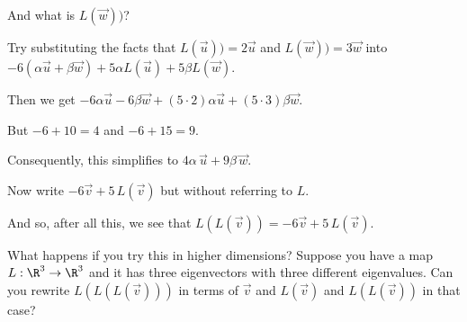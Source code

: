 \documentclass{ximera}
\begin{document}
\begin{question}
\begin{question}
    \begin{hint}
      \begin{question}
        \begin{solution}
          And what is $L(\vec{w}))$?

          \begin{multiple-choice}
          \end{multiple-choice} 
        \end{solution}
      \end{question}
    \end{hint}

    \begin{hint}
      Try substituting the facts that $L(\vec{u})) = 2 \vec{u}$ and $L(\vec{w})) = 3 \vec{w}$ into $-6 \left( \alpha \vec{u} + \beta \vec{w} \right) + 5 \alpha L(\vec{u}) + 5 \beta L(\vec{w})$.
    \end{hint}    

    \begin{hint}
      Then we get $-6 \alpha \vec{u} - 6 \beta \vec{w} + (5 \cdot 2) \alpha \vec{u} + (5 \cdot 3) \beta \vec{w}$.
    \end{hint}    

    \begin{hint}
      But $-6 + 10 = 4$ and $-6 + 15 = 9$.
    \end{hint}    

    \begin{hint}
      Consequently, this simplifies to $4\alpha\,\vec{u} + 9\beta\,\vec{w}$.
    \end{hint}    

    Now write $-6 \vec{v} + 5 \, L(\vec{v})$ but without referring to $L$.
    \begin{multiple-choice}
    \end{multiple-choice} 
  \end{question}

  And so, after all this, we see that $L(L(\vec{v})) = -6 \vec{v} + 5 \, L(\vec{v})$.

  What happens if you try this in higher dimensions?  Suppose you have
  a map $L : \R^3 \to \R^3$ and it has three eigenvectors with three
  different eigenvalues.  Can you rewrite $L(L(L(\vec{v})))$ in terms
  of $\vec{v}$ and $L(\vec{v})$ and $L(L(\vec{v}))$ in that case?

\end{question}
\end{document}

